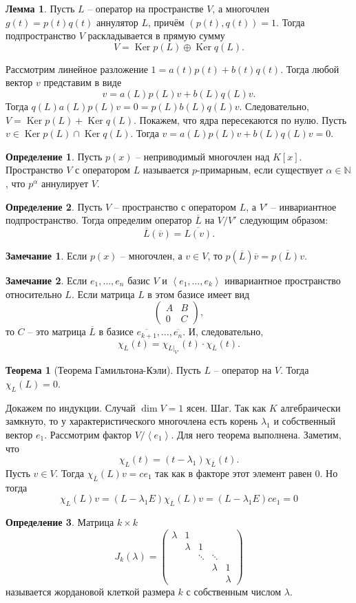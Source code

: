 \documentclass[10pt,a4paper,oneside]{book} %
\theoremstyle{definition}
\newtheorem*{rem}{Замечание}
\newtheorem*{defn}{Определение}
\newtheorem{thm}{Теорема}
\newtheorem{lem}{Лемма}
\newcommand{\mb}[1]{\mathbb{#1}}
\newcommand{\ovl}{\overline}
\DeclareMathOperator{\Ker}{Ker}
\def\lan{\left\langle }
\def\ran{\right\rangle}
\def\thrm{\begin{thm}}
\def\ethrm{\end{thm}}
\def\dfn{\begin{defn}}
\def\edfn{\end{defn}}
\def\lm{\begin{lem}}
\def\elm{\end{lem}}
\def\rm{\begin{rem}}
\def\erm{\end{rem}}
\def\pmat{\begin{pmatrix}}
\def\epmat{\end{pmatrix}}
\begin{document}
\lm Пусть $L$ -- оператор на пространстве $V$, а  многочлен $g(t)=p(t)q(t)$ аннулятор $L$, причём $(p(t),q(t))=1$. Тогда подпространство $V$ раскладывается в прямую сумму
$$V = \Ker p(L)\oplus \Ker q(L).$$
\elm
\proof Рассмотрим линейное разложение $1=a(t)p(t)+b(t)q(t)$. Тогда любой вектор $v$  представим в виде
$$v=a(L)p(L)v+ b(L)q(L)v.$$
Тогда $q(L)a(L)p(L)v=0=p(L)b(L)q(L)v$. Следовательно, $V= \Ker p(L)+\Ker q(L)$. Покажем, что ядра пересекаются по нулю. Пусть $v\in \Ker p(L) \cap \Ker q(L)$. Тогда $v=a(L)p(L)v+ b(L)q(L)v=0$.
\endproof

\dfn Пусть $p(x)$ -- неприводимый многочлен над $K[x]$. Пространство $V$ с оператором $L$ называется $p$-примарным, если существует $\alpha \in \mb N$, что $p^{\alpha}$ аннулирует $V$.
\edfn

\dfn Пусть $V$ -- пространство с оператором $L$, а $V'$ -- инвариантное подпространство. Тогда определим оператор $\ovl{L}$ на $V/V'$ следующим образом:
$$\ovl{L}(\ovl{v})=\ovl{L(v)}.$$
\edfn

\rm Если $p(x)$ -- многочлен, а $v\in V$, то $p(\ovl{L})\ovl{v}=\ovl{p(L)v}$.
\erm

\rm Если $e_1,\dots,e_n$ базис $V$ и $\lan e_1,\dots,e_k\ran$ инвариантное пространство относительно $L$. Если  матрица $L$ в этом базисе имеет вид $$\pmat A& B \\ 0 & C\epmat,$$
то $C$ -- это матрица $\ovl{L}$ в базисе
$\ovl{e_{k+1}},\dots,\ovl{e_n}$.
И, следовательно, $$\chi_L(t)=\chi_{L|_{V'}}(t)\cdot \chi_{\ovl{L}}(t).$$
\erm

\thrm[Теорема Гамильтона-Кэли] Пусть $L$ -- оператор на $V$. Тогда $\chi_L(L)=0$.
\ethrm
\proof Докажем по индукции. Случай $\dim V=1$ ясен. Шаг. Так как $K$ алгебраически замкнуто, то у характеристического многочлена есть корень $\lambda_1$ и собственный вектор $e_1$. Рассмотрим фактор $V/\lan e_1\ran$. Для него теорема выполнена. Заметим, что $$\chi_L(t)= (t-\lambda_1)\chi_{\ovl{L}}(t).$$
Пусть $v \in V$. Тогда $\chi_{\ovl{L}}(L)v = ce_1$ так как в факторе этот элемент равен 0. Но тогда
$$\chi_L(L)v= (L-\lambda_1 E)\chi_{\ovl{L}}(L)v=(L-\lambda_1 E) ce_1=0$$
\endproof











\dfn
Матрица $k\times k$
$$J_k(\lambda) = \begin{pmatrix}
\lambda& 1&& \\
& \lambda &1& \\
&&\ddots &\ddots& \\
&  && \lambda & 1\\
&  &&& \lambda
\end{pmatrix}
$$
называется жордановой клеткой размера $k$ с собственным числом $\lambda$.
\edfn
\end{document}

